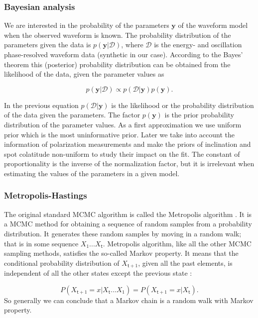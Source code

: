 \documentclass{wihuri}
\def\be{\begin{equation}}
\def\ee{\end{equation}}
\def\tstep{\mathsf{t}}
\begin{document}
\subsubsection{Bayesian analysis}

We are interested in the probability of the parameters $\textbf{y}$ of the waveform model when the observed waveform is known. The probability distribution of the parameters given the data is $p(\textbf{y}|\mathcal{D})$, where $\mathcal{D}$ is the energy- and oscillation phase-resolved waveform data (synthetic in our case). According to the Bayes' theorem this (posterior) probability distribution can be obtained from the likelihood of the data, given the parameter values as \cite{nattila_bayes}


\be \label{eq:bayes}
p(\textbf{y}|\mathcal{D}) \propto p(\mathcal{D}|\textbf{y})p(\textbf{y}).
\ee

In the previous equation $p(\mathcal{D}|\textbf{y})$ is the likelihood or the probability distribution of the data given the parameters. The factor $p(\textbf{y})$ is the prior probability distribution of the parameter values. As a first approximation we use uniform prior which is the most uninformative prior. Later we take into account the information of polarization measurements and make the priors of inclination and spot colatitude non-uniform to study their impact on the fit. The constant of proportionality is the inverse of the normalization factor, but it is irrelevant when estimating the values of the parameters in a given model. 


\subsubsection{Metropolis-Hastings}

The original standard MCMC algorithm is called the Metropolis algorithm \cite{metropolis53}\cite{hastings70}. %
It is a MCMC method for obtaining a sequence of random samples from a probability distribution. It generates these random samples by moving in a random walk; that is in some sequence $X_{1}...X_{\tstep}$. Metropolis algorithm, like all the other MCMC sampling methods, satisfies the so-called Markov property. It means that the conditional probability distribution of $X_{\tstep+1}$, given all the past elements, is independent of all the other states except the previous state \cite{kaiser}:

 \be \label{eq:markov_prop}
P(X_{\tstep +1} = x|X_{\tstep}. . . X_{1}) = P(X_{\tstep +1} = x|X_{\tstep}).
\ee
So generally we can conclude that a Markov chain is a random walk with Markov property.
 
\end{document}
